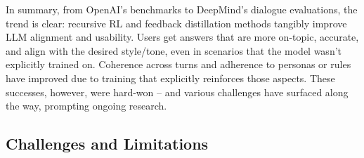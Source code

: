\documentclass{article}
\begin{document}
In summary, from OpenAI’s benchmarks to DeepMind’s dialogue evaluations, the trend is clear: recursive RL and feedback distillation methods tangibly improve LLM alignment and usability. Users get answers that are more on-topic, accurate, and align with the desired style/tone, even in scenarios that the model wasn’t explicitly trained on. Coherence across turns and adherence to personas or rules have improved due to training that explicitly reinforces those aspects. These successes, however, were hard-won – and various challenges have surfaced along the way, prompting ongoing research.

\subsection{Challenges and Limitations}
\end{document}
